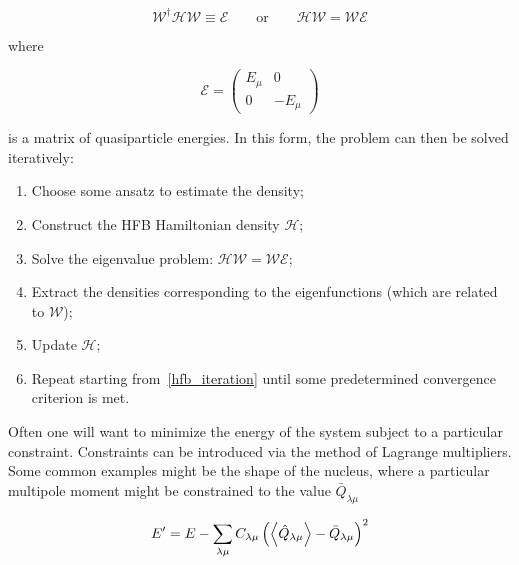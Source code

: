 \begin{equation}
\mathcal{W}^\dagger \mathcal{H} \mathcal{W} \equiv \mathcal{E} \qquad\mathrm{or}\qquad \mathcal{H}\mathcal{W} = \mathcal{W}\mathcal{E}
\end{equation}

\noindent where

\begin{equation}
\mathcal{E} = \left(\begin{array}{cc}
E_\mu & 0 \\
0 & -E_\mu
\end{array}\right)
\end{equation}

\noindent is a matrix of quasiparticle energies. In this form, the problem can then be solved iteratively:
\begin{enumerate}
	\setlength\itemsep{-2em}
	\item Choose some ansatz to estimate the density;\\
	\item Construct the HFB Hamiltonian density $\mathcal{H}$;\\
	\item Solve the eigenvalue problem: $\mathcal{H}\mathcal{W} = \mathcal{W}\mathcal{E}$; \label{hfb_iteration}\\
	\item Extract the densities corresponding to the eigenfunctions (which are related to $\mathcal{W}$);\\
	\item Update $\mathcal{H}$; \\
	\item Repeat starting from~\ref{hfb_iteration} until some predetermined convergence criterion is met.
\end{enumerate}


Often one will want to minimize the energy of the system subject to a particular constraint. Constraints can be introduced via the method of Lagrange multipliers. Some common examples might be the shape of the nucleus, where a particular multipole moment might be constrained to the value $\bar{Q}_{\lambda\mu}$

\begin{equation}\label{eq:routhian}
E' = E - \sum_{\lambda\mu} C_{\lambda\mu} \left(\expval{\hat{Q}_{\lambda\mu}} - \bar{Q}_{\lambda\mu}\right)^2
\end{equation}

